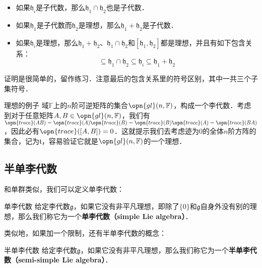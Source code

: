 \begin{itemize}
\item 如果$\mathfrak{h}_i$是子代数，那么$\mathfrak{h}_1\cap\mathfrak{h}_2$也是子代数．
\item 如果$\mathfrak{h}_1$是子代数而$\mathfrak{h}_2$是理想，那么$\mathfrak{h}_1+\mathfrak{h}_2$是子代数．
\item 如果$\mathfrak{h}_i$是理想，那么$\mathfrak{h}_1+\mathfrak{h}_2$、$\mathfrak{h}_1\cap\mathfrak{h}_2$和$[\mathfrak{h}_1, \mathfrak{h}_2]$都是理想，并且有如下包含关系：\begin{equation}
[\mathfrak{h}_1, \mathfrak{h}_2]\subseteq\mathfrak{h}_1\cap\mathfrak{h}_2\subseteq\mathfrak{h}_i\subseteq\mathfrak{h}_1+\mathfrak{h}_2
\end{equation}

\end{itemize}

证明是很简单的，留作练习．注意最后的包含关系里的符号区别，其中一共三个子集符号．

\begin{example}{理想的例子}
域$\mathbb{F}$上的$n$阶可逆矩阵的集合$\opn{gl}(n, \mathbb{F})$，构成一个李代数．考虑到对于任意矩阵$A, B\in\opn{gl}(n, \mathbb{F})$，我们有$\opn{trace}(AB)=\opn{trace}(A)\opn{trace}(B)=\opn{trace}(B)\opn{trace}(A)=\opn{trace}(BA)$，因此必有$\opn{trace}([A, B])=0$．这就提示我们去考虑迹为$0$的全体$n$阶方阵的集合，记为$\mathfrak{t}$，容易验证它就是$\opn{gl}(n, \mathbb{F})$的一个理想．
\end{example}


\subsection{半单李代数}

和单群类似，我们可以定义单李代数：

\begin{definition}{单李代数}
给定李代数$\mathfrak{g}$，如果它没有非平凡理想，即除了$\{0\}$和$\mathfrak{g}$自身外没有别的理想，那么我们称它为一个\textbf{单李代数（simple Lie algebra）}．
\end{definition}

类似地，如果加一个限制，还有半单李代数的概念：
\begin{definition}{半单李代数}
给定李代数$\mathfrak{g}$，如果它没有非平凡理想，那么我们称它为一个\textbf{半单李代数（semi-simple Lie algebra）}．
\end{definition}





